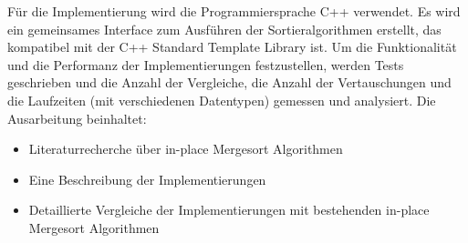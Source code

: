 \documentclass[12pt,pdftex,a4paper]{article}
\begin{document}
Für die Implementierung wird die Programmiersprache C++ verwendet. Es wird ein gemeinsames Interface zum Ausführen der Sortieralgorithmen erstellt, das kompatibel mit der C++ Standard Template Library ist. Um die Funktionalität und die Performanz der Implementierungen festzustellen, werden Tests geschrieben und die Anzahl der Vergleiche, die Anzahl der Vertauschungen und die Laufzeiten (mit verschiedenen Datentypen) gemessen und analysiert.
Die Ausarbeitung beinhaltet: 
\begin{itemize}
\item Literaturrecherche über in-place Mergesort Algorithmen
\item Eine Beschreibung der Implementierungen
\item Detaillierte Vergleiche der Implementierungen mit bestehenden in-place Mergesort Algorithmen
\end{itemize}
	

\end{document}
